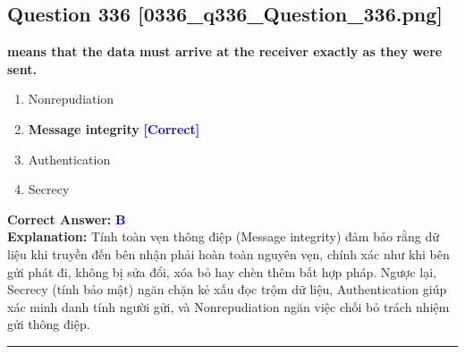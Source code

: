 \documentclass[11pt,a4paper]{article}
\begin{document}
\begin{minipage}{\textwidth}
\subsection*{Question 336 \quad \footnotesize{[0336\_q336\_Question\_336.png]}}
\noindent \textbf{means that the data must arrive at the receiver exactly as they were sent.}

\begin{enumerate}[label=\Alph*.]
    \item Nonrepudiation
    \item \textbf{Message integrity} \hfill \textcolor{blue}{\textbf{[Correct]}}
    \item Authentication
    \item Secrecy
\end{enumerate}

\noindent \textbf{Correct Answer:} \textcolor{blue}{\textbf{B}} \\[2pt]
\noindent \textbf{Explanation:} Tính toàn vẹn thông điệp (Message integrity) đảm bảo rằng dữ liệu khi truyền đến bên nhận phải hoàn toàn nguyên vẹn, chính xác như khi bên gửi phát đi, không bị sửa đổi, xóa bỏ hay chèn thêm bất hợp pháp. Ngược lại, Secrecy (tính bảo mật) ngăn chặn kẻ xấu đọc trộm dữ liệu, Authentication giúp xác minh danh tính người gửi, và Nonrepudiation ngăn việc chối bỏ trách nhiệm gửi thông điệp.

\par\vspace{0.3cm}
\hrule
\vspace{0.3cm}
\end{minipage}
\end{document}
